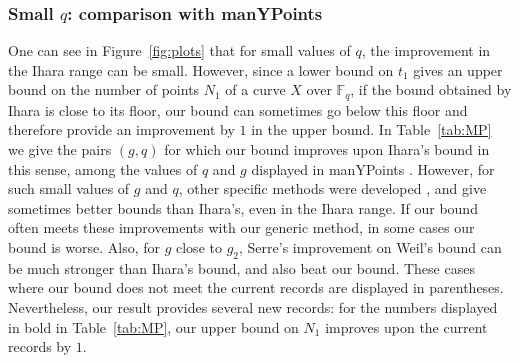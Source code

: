 \documentclass{amsart}
\newcommand{\F}{\mathbb{F}}
\begin{document}
\subsubsection{Small $q$: comparison with manYPoints} \label{sec:MP}
One can see in Figure~\ref{fig:plots} that for small values of $q$, the improvement in the Ihara range can be small.
However, since a lower bound on $t_1$ gives an upper bound on the number of points $N_1$ of a curve $X$ over $\F_q$, if the bound obtained by Ihara is close to its floor, our bound can sometimes go below this floor and therefore provide an improvement by $1$ in the upper bound.
In Table~\ref{tab:MP} we give the pairs $(g,q)$ for which our bound improves upon Ihara's bound in this sense, among the values of $q$ and $g$ displayed in manYPoints \cite{MP}.
However, for such small values of $g$ and $q$, other specific methods were developed \cite{HL03, HL12}, and give sometimes better bounds than Ihara's, even in the Ihara range.
If our bound often meets these improvements with our generic method, in some cases our bound is worse.
Also, for $g$ close to $g_2$, Serre's improvement on Weil's bound can be much stronger than Ihara's bound, and also beat our bound.
These cases where our bound does not meet the current records are displayed in parentheses. 
Nevertheless, our result provides several new records: for the numbers displayed in bold in Table~\ref{tab:MP}, our upper bound on $N_1$ improves upon the current records by $1$.
\end{document}
